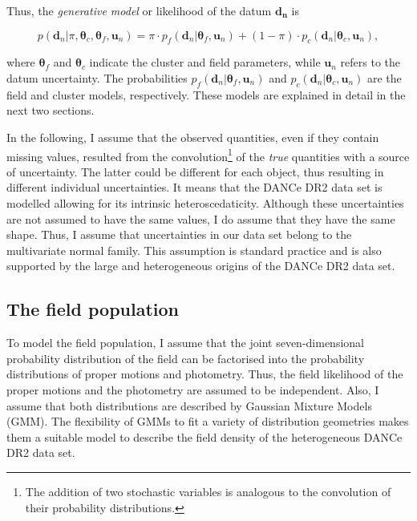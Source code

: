 Thus, the \emph{generative model} or likelihood of the datum $\mathbf{d_n}$  is

\begin{equation}
\label{eq:genmod}
p(\mathbf{d}_n | \pi,\boldsymbol{\theta}_c,\boldsymbol{\theta}_f,\mathbf{u}_n)=\pi \cdot p_f(\mathbf{d}_n|\boldsymbol{\theta}_f,\mathbf{u}_n) + (1-\pi)\cdot p_c(\mathbf{d}_n| \boldsymbol{\theta}_c,\mathbf{u}_n),
\end{equation}

where $\boldsymbol{\theta}_f$ and $\boldsymbol{\theta}_c$ indicate the cluster and field parameters, while $\mathbf{u}_n$ refers to the datum uncertainty. The probabilities $p_f(\mathbf{d}_n|\boldsymbol{\theta}_f,\mathbf{u}_n)$ and $p_c(\mathbf{d}_n| \boldsymbol{\theta}_c,\mathbf{u}_n)$ are the field and cluster models, respectively. These models are explained in detail in the next two sections.

In the following, I assume that the observed quantities, even if they contain missing values, resulted from the convolution\footnote{The addition of two stochastic variables is analogous to the convolution of their probability distributions.} of the \emph{true} quantities with a source of uncertainty. The latter could be different for each object, thus resulting in different individual uncertainties. It means that the DANCe DR2 data set is modelled allowing for its intrinsic heteroscedaticity. Although these uncertainties are not assumed to have the same values, I do assume that they have the same shape. Thus, I assume that uncertainties in our data set belong to the multivariate normal family.  This assumption is standard practice and is also supported by the large and heterogeneous origins of the DANCe DR2 data set. 

\subsection{The field population}
To model the field population, I assume that the joint seven-dimensional probability distribution of the field can be factorised into the probability distributions of proper motions and photometry. Thus, the field likelihood of the proper motions and the photometry are assumed to be independent. Also, I assume that both distributions are described by Gaussian Mixture Models (GMM). The flexibility of GMMs to fit a variety of distribution geometries makes them a suitable model to describe the field density of the heterogeneous DANCe DR2 data set. 

